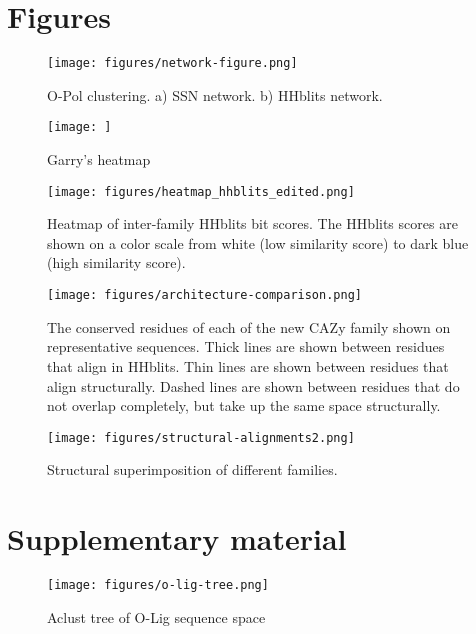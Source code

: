 \documentclass{article}
\begin{document}
\clearpage

\section{Figures}

\begin{figure}[htbp]
    \centering
    \texttt{[image: figures/network-figure.png]}
    \caption{O-Pol clustering. a) SSN network. b) HHblits network.}
    \label{fig:wzy-clustering}
\end{figure}

\begin{figure}
    \centering
    \texttt{[image: ]}
    \caption{Garry's heatmap}
    \label{fig:sugar-heatmap}
\end{figure}

\begin{figure}[htbp]
    \centering
    \texttt{[image: figures/heatmap\_hhblits\_edited.png]}
    \caption{Heatmap of inter-family HHblits bit scores. The HHblits scores are shown on a color scale from white (low similarity score) to dark blue (high similarity score).}
    \label{fig:heatmap-hhblits}
\end{figure}

\begin{figure}[htbp]
    \centering
    \texttt{[image: figures/architecture-comparison.png]}
    \caption{The conserved residues of each of the new CAZy family shown on representative sequences. Thick lines are shown between residues that align in HHblits. Thin lines are shown between residues that align structurally. Dashed lines are shown between residues that do not overlap completely, but take up the same space structurally.}
    \label{fig:architecture-comparison}
\end{figure}

\begin{figure}
    \centering
    \texttt{[image: figures/structural-alignments2.png]}
    \caption{Structural superimposition of different families.}
    \label{fig:structural_alignments}
\end{figure}

\clearpage

\section{Supplementary material}

\begin{figure}[htbp]
    \centering
    \texttt{[image: figures/o-lig-tree.png]}
    \caption{Aclust tree of O-Lig sequence space}
    \label{fig:o-lig-tree}
\end{figure}
\end{document}
